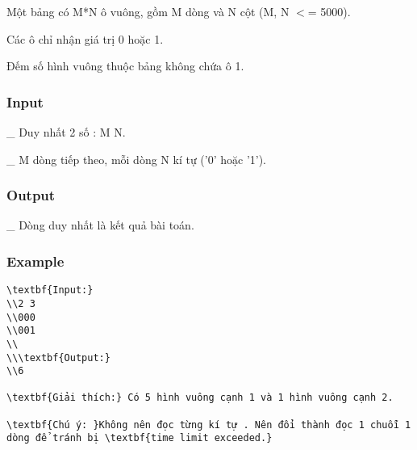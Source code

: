 



   Một bảng có M*N ô vuông, gồm M dòng và N cột (M, N $<$= 5000).  

   Các ô chỉ nhận giá trị 0 hoặc 1.  

   Đếm số hình vuông thuộc bảng không chứa ô 1.  

\subsubsection{   Input  }

   \_ Duy nhất 2 số : M N.  

   \_ M dòng tiếp theo, mỗi dòng N kí tự ('0' hoặc '1').  

\subsubsection{   Output  }

   \_ Dòng duy nhất là kết quả bài toán.  

\subsubsection{   Example  }
\begin{verbatim}
\textbf{Input:}
\\2 3
\\000
\\001
\\
\\\textbf{Output:}
\\6

\textbf{Giải thích:} Có 5 hình vuông cạnh 1 và 1 hình vuông cạnh 2.

\textbf{Chú ý: }Không nên đọc từng kí tự . Nên đổi thành đọc 1 chuỗi 1 dòng để tránh bị \textbf{time limit exceeded.}\end{verbatim}